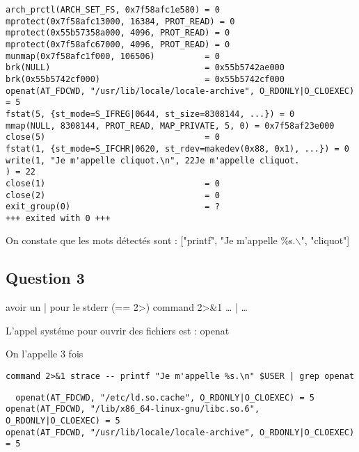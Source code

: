 \documentclass[11pt]{article}
\begin{document}
\begin{lstlisting}
arch_prctl(ARCH_SET_FS, 0x7f58afc1e580) = 0
mprotect(0x7f58afc13000, 16384, PROT_READ) = 0
mprotect(0x55b57358a000, 4096, PROT_READ) = 0
mprotect(0x7f58afc67000, 4096, PROT_READ) = 0
munmap(0x7f58afc1f000, 106506)          = 0
brk(NULL)                               = 0x55b5742ae000
brk(0x55b5742cf000)                     = 0x55b5742cf000
openat(AT_FDCWD, "/usr/lib/locale/locale-archive", O_RDONLY|O_CLOEXEC) = 5
fstat(5, {st_mode=S_IFREG|0644, st_size=8308144, ...}) = 0
mmap(NULL, 8308144, PROT_READ, MAP_PRIVATE, 5, 0) = 0x7f58af23e000
close(5)                                = 0
fstat(1, {st_mode=S_IFCHR|0620, st_rdev=makedev(0x88, 0x1), ...}) = 0
write(1, "Je m'appelle cliquot.\n", 22Je m'appelle cliquot.
) = 22
close(1)                                = 0
close(2)                                = 0
exit_group(0)                           = ?
+++ exited with 0 +++
\end{lstlisting}

On constate que les mots détectés sont : ["printf", "Je m'appelle \%s.$\backslash$\n",
"cliquot"]


\subsection{Question 3}
\label{sec:org786a8ab}

avoir un | pour le stderr (== 2>)
command 2>\&1 \ldots{} | \ldots{}

L'appel systéme pour ouvrir des fichiers est : openat

On l'appelle 3 fois

\begin{lstlisting}
command 2>&1 strace -- printf "Je m'appelle %s.\n" $USER | grep openat
\end{lstlisting}

\begin{lstlisting}
  openat(AT_FDCWD, "/etc/ld.so.cache", O_RDONLY|O_CLOEXEC) = 5
openat(AT_FDCWD, "/lib/x86_64-linux-gnu/libc.so.6", O_RDONLY|O_CLOEXEC) = 5
openat(AT_FDCWD, "/usr/lib/locale/locale-archive", O_RDONLY|O_CLOEXEC) = 5

\end{lstlisting}
\end{document}
